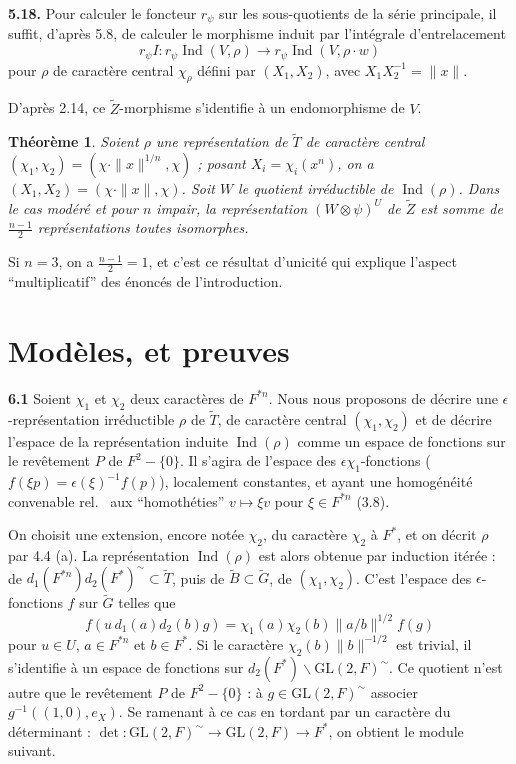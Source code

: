 \documentclass[12pt,a4paper]{article}
\theoremstyle{plain}
\newtheorem{theorem}{Théorème}[section]
\theoremstyle{definition}
\theoremstyle{remark}
\DeclareMathOperator{\Ind}{Ind}
\newcommand{\wt}{\widetilde}
\begin{document}
\textbf{5.18.} Pour calculer le foncteur $r_\psi$ sur les sous-quotients de la série principale, il suffit, d'après 5.8, de calculer le morphisme induit par l'intégrale d'entrelacement
\begin{equation}\label{eq:5.18.1}
r_\psi I : r_\psi \Ind(V, \rho) \longrightarrow r_\psi \Ind(V, \rho \cdot w)
\tag{5.18.1}
\end{equation}
pour $\rho$ de caractère central $\chi_\rho$ défini par $(X_1, X_2)$, avec $X_1 X_2^{-1} = \|x\|$.

D'après 2.14, ce $\wt{Z}$-morphisme s'identifie à un endomorphisme de $V$.

\begin{theorem}\label{thm:5.19}
Soient $\rho$ une représentation de $\wt{T}$ de caractère central $(\chi_1, \chi_2) = (\chi \cdot \|x\|^{1/n}, \chi)$ ; posant $X_i = \chi_i(x^n)$, on a $(X_1, X_2) = (\chi \cdot \|x\|, \chi)$. Soit $W$ le quotient irréductible de $\Ind(\rho)$. Dans le cas modéré et pour $n$ impair, la représentation $(W \otimes \psi)^U$ de $\wt{Z}$ est somme de $\frac{n-1}{2}$ représentations toutes isomorphes.
\end{theorem}

Si $n = 3$, on a $\frac{n-1}{2} = 1$, et c'est ce résultat d'unicité qui explique l'aspect ``multiplicatif'' des énoncés de l'introduction.


\section{Modèles, et preuves}

\textbf{6.1} Soient $\chi_1$ et $\chi_2$ deux caractères de $F^{*n}$. Nous nous proposons de décrire une $\epsilon$-représentation irréductible $\rho$ de $\wt{T}$, de caractère central $(\chi_1, \chi_2)$ et de décrire l'espace de la représentation induite $\Ind(\rho)$ comme un espace de fonctions sur le revêtement $P$ de $F^2 - \{0\}$. Il s'agira de l'espace des $\epsilon \chi_1$-fonctions ($f(\xi p) = \epsilon(\xi)^{-1} f(p)$), localement constantes, et ayant une homogénéité convenable rel.
\ aux ``homothéties'' $v \mapsto \xi v$ pour $\xi \in F^{*n}$ (3.8).

On choisit une extension, encore notée $\chi_2$, du caractère $\chi_2$ à $F^*$, et on décrit $\rho$ par 4.4 (a). La représentation $\Ind(\rho)$ est alors obtenue par induction itérée : de $d_1(F^{*n}) d_2(F^*)^\sim \subset \wt{T}$, puis de $\wt{B} \subset \wt{G}$, de $(\chi_1, \chi_2)$. C'est l'espace des $\epsilon$-fonctions $f$ sur $\wt{G}$ telles que
\[
f(u \, d_1(a) d_2(b) g) = \chi_1(a) \chi_2(b) \|a/b\|^{1/2} f(g)
\]
pour $u \in U$, $a \in F^{*n}$ et $b \in F^*$. Si le caractère $\chi_2(b) \|b\|^{-1/2}$ est trivial, il s'identifie à un espace de fonctions sur $d_2(F^*) \backslash \mathrm{GL}(2, F)^\sim$. Ce quotient n'est autre que le revêtement $P$ de $F^2 - \{0\}$ : à $g \in \mathrm{GL}(2, F)^\sim$ associer $g^{-1}((1, 0), e_X)$. Se ramenant à ce cas en tordant par un caractère du déterminant : $\det : \mathrm{GL}(2, F)^\sim \to \mathrm{GL}(2, F) \to F^*$, on obtient le module suivant.
\end{document}
